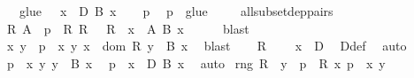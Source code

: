 \begin{isabellebody}
\ \ \ {\isachardoublequoteopen}glue\ {\isasymR}\ {\isasymsubseteq}\ {\isasymSum}x\ {\isasymin}\ D{\isachardot}{\kern0pt}\ {\isacharparenleft}{\kern0pt}B\ x{\isacharparenright}{\kern0pt}{\isachardoublequoteclose}\isanewline
%
\isadelimproof
%
\endisadelimproof
%
\isatagproof
{}\isamarkupfalse%
\isanewline
\ \ \isamarkupfalse%
\ p\ \isamarkupfalse%
\ {\isachardoublequoteopen}p\ {\isasymin}\ glue\ {\isasymR}{\isachardoublequoteclose}\isanewline
\ \ \isamarkupfalse%
\ all{\isacharunderscore}{\kern0pt}subset{\isacharunderscore}{\kern0pt}dep{\isacharunderscore}{\kern0pt}pairs\ \isamarkupfalse%
\ R\ A\ \ {\isachardoublequoteopen}p\ {\isasymin}\ R{\isachardoublequoteclose}\ {\isachardoublequoteopen}R\ {\isasymin}\ {\isasymR}{\isachardoublequoteclose}\ {\isachardoublequoteopen}R\ {\isasymsubseteq}\ {\isasymSum}x\ {\isasymin}\ A{\isachardot}{\kern0pt}\ B\ x{\isachardoublequoteclose}\isanewline
\ \ \ \ \isamarkupfalse%
\ blast\isanewline
\ \ \isamarkupfalse%
\ \isamarkupfalse%
\ x\ y\ \ {\isachardoublequoteopen}p\ {\isacharequal}{\kern0pt}\ {\isasymlangle}x{\isacharcomma}{\kern0pt}\ y{\isasymrangle}{\isachardoublequoteclose}\ {\isachardoublequoteopen}x\ {\isasymin}\ dom\ R{\isachardoublequoteclose}\ {\isachardoublequoteopen}y\ {\isasymin}\ B\ x{\isachardoublequoteclose}\ \isamarkupfalse%
\ blast\isanewline
\ \ \isamarkupfalse%
\ {\isacartoucheopen}R\ {\isasymin}\ {\isasymR}{\isacartoucheclose}\ \isamarkupfalse%
\ {\isachardoublequoteopen}x\ {\isasymin}\ D{\isachardoublequoteclose}\ \isamarkupfalse%
\ D{\isacharunderscore}{\kern0pt}def\ \isamarkupfalse%
\ auto\isanewline
\ \ \isamarkupfalse%
\ {\isacartoucheopen}p\ {\isacharequal}{\kern0pt}\ {\isasymlangle}x{\isacharcomma}{\kern0pt}\ y{\isasymrangle}{\isacartoucheclose}\ {\isacartoucheopen}y\ {\isasymin}\ B\ x{\isacartoucheclose}\ \isamarkupfalse%
\ {\isachardoublequoteopen}p\ {\isasymin}\ {\isasymSum}x\ {\isasymin}\ D{\isachardot}{\kern0pt}\ {\isacharparenleft}{\kern0pt}B\ x{\isacharparenright}{\kern0pt}{\isachardoublequoteclose}\ \isamarkupfalse%
\ auto\isanewline
{}\isamarkupfalse%
%
\endisatagproof
{\isafoldproof}%
%
\isadelimproof
\isanewline
%
\endisadelimproof
\isanewline
{}\isamarkupfalse%
\ {\isachardoublequoteopen}rng\ R\ {\isasymequiv}\ {\isacharbraceleft}{\kern0pt}y\ {\isacharbar}{\kern0pt}\ p\ {\isasymin}\ R{\isacharcomma}{\kern0pt}\ {\isasymexists}x{\isachardot}{\kern0pt}\ p\ {\isacharequal}{\kern0pt}\ {\isasymlangle}x{\isacharcomma}{\kern0pt}\ y{\isasymrangle}{\isacharbraceright}{\kern0pt}{\isachardoublequoteclose}\isanewline

\end{isabellebody}

